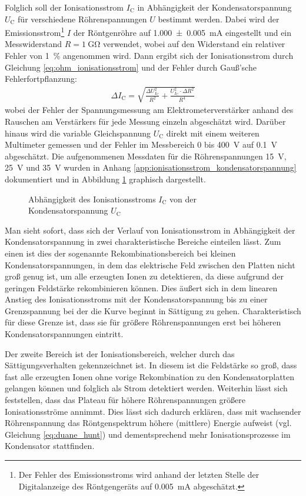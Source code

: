 \documentclass[11pt, a4paper]{article}
\numberwithin{equation}{section}
\begin{document}
Folglich soll der Ionisationsstrom $I_\mathrm{C}$ in Abhängigkeit der Kondensatorspannung $U_\mathrm{C}$ für verschiedene Röhrenspannungen $U$ bestimmt werden.
Dabei wird der Emissionsstrom\footnote{Der Fehler des Emissionsstroms wird anhand der letzten Stelle der Digitalanzeige des Röntgengeräts auf \SI{0.005}{\milli\ampere} abgeschätzt.} $I$ der Röntgenröhre auf \SI{1.000 +- 0.005}{mA} eingestellt und ein Messwiderstand $R = \SI{1}{\giga\ohm}$ verwendet, wobei auf den Widerstand ein relativer Fehler von \SI{1}{\percent} angenommen wird.
Dann ergibt sich der Ionisationsstrom durch Gleichung \ref{eq:ohm_ionisationsstrom} und der Fehler durch Gauß'sche Fehlerfortpflanzung:
\begin{align}
	\Delta I_\mathrm{C} = \sqrt{\frac{\Delta U_{I_\mathrm{C}}^2}{R^2} + \frac{U_{I_\mathrm{C}}^2 \cdot \Delta R^2}{R^4}}
\end{align}
wobei der Fehler der Spannungsmessung am Elektrometerverstärker anhand des Rauschen am Verstärkers für jede Messung einzeln abgeschätzt wird.
Darüber hinaus wird die variable Gleichspannung $U_\mathrm{C}$ direkt mit einem weiteren Multimeter gemessen und der Fehler im Messbereich \num{0} bis \SI{400}{V} auf \SI{0.1}{V} abgeschätzt.
Die aufgenommenen Messdaten für die Röhrenspannungen \SI{15}{V}, \SI{25}{V} und \SI{35}{V} wurden in Anhang \ref{app:ionisationsstrom_kondensatorspannung} dokumentiert und in Abbildung \ref{fig:kondensatorspannung} graphisch dargestellt.
\begin{figure}[ht]
	\centering
	
	\caption{Abhängigkeit des Ionisationsstroms $I_\mathrm{C}$ von der Kondensatorspannung $U_\mathrm{C}$}
	\label{fig:kondensatorspannung}
\end{figure}

Man sieht sofort, dass sich der Verlauf von Ionisationsstrom in Abhängigkeit der Kondensatorspannung in zwei charakteristische Bereiche einteilen lässt.
Zum einen ist dies der sogenannte Rekombinationsbereich bei kleinen Kondensatorspannungen, in dem das elektrische Feld zwischen den Platten nicht groß genug ist, um alle erzeugten Ionen zu detektieren, da diese aufgrund der geringen Feldstärke rekombinieren können.
Dies äußert sich in dem linearen Anstieg des Ionisationsstroms mit der Kondensatorspannung bis zu einer Grenzspannung bei der die Kurve beginnt in Sättigung zu gehen.
Charakteristisch für diese Grenze ist, dass sie für größere Röhrenspannungen erst bei höheren Kondensatorspannungen eintritt.

Der zweite Bereich ist der Ionisationsbereich, welcher durch das Sättigungsverhalten gekennzeichnet ist.
In diesem ist die Feldstärke so groß, dass fast alle erzeugten Ionen ohne vorige Rekombination zu den Kondensatorplatten gelangen können und folglich als Strom detektiert werden.
Weiterhin lässt sich feststellen, dass das Plateau für höhere Röhrenspannungen größere Ionisationsströme annimmt.
Dies lässt sich dadurch erklären, dass mit wachsender Röhrenspannung das Röntgenspektrum höhere (mittlere) Energie aufweist (vgl. Gleichung \ref{eq:duane_hunt}) und dementsprechend mehr Ionisationsprozesse im Kondensator stattfinden.
\end{document}
